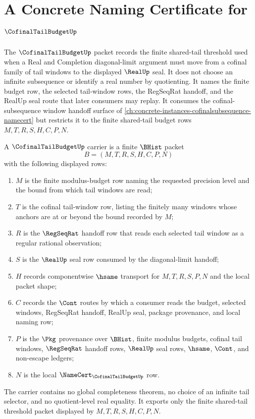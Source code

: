 \chapter{A Concrete Naming Certificate for $\CofinalTailBudgetUp$}
\label{ch:concrete-instances-cofinal-tail-budget-namecert}

The $\CofinalTailBudgetUp$ packet records the finite shared-tail threshold used when a Real and Completion diagonal-limit argument must move from a cofinal family of tail windows to the displayed $\RealUp$ seal. It does not choose an infinite subsequence or identify a real number by quotienting. It names the finite budget row, the selected tail-window rows, the RegSeqRat handoff, and the RealUp seal route that later consumers may replay. It consumes the cofinal-subsequence window handoff surface of \autoref{ch:concrete-instances-cofinalsubsequence-namecert} but restricts it to the finite shared-tail budget rows $M,T,R,S,H,C,P,N$.

\begin{definition}
\label{def:cofinal-tail-budget-carrier}
A $\CofinalTailBudgetUp$ carrier is a finite $\BHist$ packet
$$
B=(M,T,R,S,H,C,P,N)
$$
with the following displayed rows:
\begin{enumerate}
\item $M$ is the finite modulus-budget row naming the requested precision level and the bound from which tail windows are read;
\item $T$ is the cofinal tail-window row, listing the finitely many windows whose anchors are at or beyond the bound recorded by $M$;
\item $R$ is the $\RegSeqRat$ handoff row that reads each selected tail window as a regular rational observation;
\item $S$ is the $\RealUp$ seal row consumed by the diagonal-limit handoff;
\item $H$ records componentwise $\hsame$ transport for $M,T,R,S,P,N$ and the local packet shape;
\item $C$ records the $\Cont$ routes by which a consumer reads the budget, selected windows, RegSeqRat handoff, RealUp seal, package provenance, and local naming row;
\item $P$ is the $\Pkg$ provenance over $\BHist$, finite modulus budgets, cofinal tail windows, $\RegSeqRat$ handoff rows, $\RealUp$ seal rows, $\hsame$, $\Cont$, and non-escape ledgers;
\item $N$ is the local $\NameCert_{\CofinalTailBudgetUp}$ row.
\end{enumerate}
The carrier contains no global completeness theorem, no choice of an infinite tail selector, and no quotient-level real equality. It exports only the finite shared-tail threshold packet displayed by $M,T,R,S,H,C,P,N$.
\end{definition}

